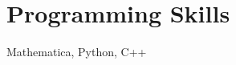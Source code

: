 \documentclass{cv_style}
\begin{document}
	\section{Programming Skills}
		Mathematica, Python, C++
		
\end{document}
